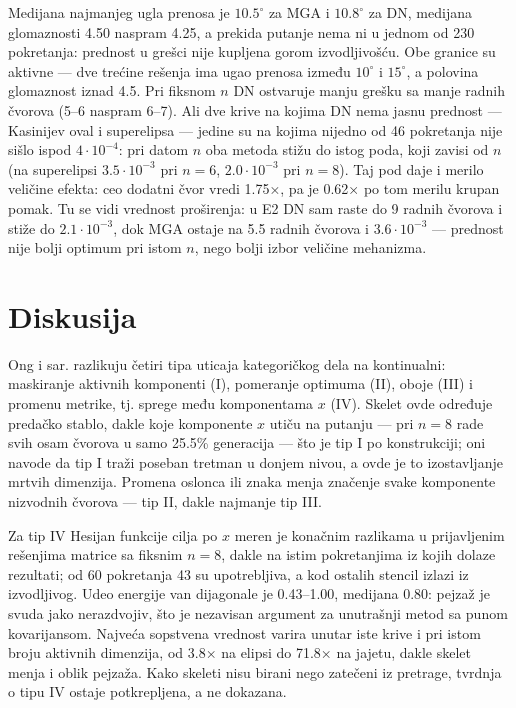 \documentclass[
  conference,
  a4paper,
  10pt]{IEEEtran}
\begin{document}
Medijana najmanjeg ugla prenosa je \(10.5^\circ\) za MGA i
\(10.8^\circ\) za DN, medijana glomaznosti 4.50 naspram 4.25, a prekida
putanje nema ni u jednom od 230 pokretanja: prednost u grešci nije
kupljena gorom izvodljivošću. Obe granice su aktivne --- dve trećine
rešenja ima ugao prenosa između \(10^\circ\) i \(15^\circ\), a polovina
glomaznost iznad 4.5. Pri fiksnom \(n\) DN ostvaruje manju grešku sa
manje radnih čvorova (5--6 naspram 6--7). Ali dve krive na kojima DN
nema jasnu prednost --- Kasinijev oval i superelipsa --- jedine su na
kojima nijedno od 46 pokretanja nije sišlo ispod \(4\cdot10^{-4}\): pri
datom \(n\) oba metoda stižu do istog poda, koji zavisi od \(n\) (na
superelipsi \(3.5\cdot10^{-3}\) pri \(n=6\), \(2.0\cdot10^{-3}\) pri
\(n=8\)). Taj pod daje i merilo veličine efekta: ceo dodatni čvor vredi
1.75×, pa je 0.62× po tom merilu krupan pomak. Tu se vidi vrednost
proširenja: u E2 DN sam raste do 9 radnih čvorova i stiže do
\(2.1\cdot10^{-3}\), dok MGA ostaje na 5.5 radnih čvorova i
\(3.6\cdot10^{-3}\) --- prednost nije bolji optimum pri istom \(n\),
nego bolji izbor veličine mehanizma.

\hypertarget{diskusija}{%
\section{Diskusija}\label{diskusija}}

Ong i sar. \citep{igbd} razlikuju četiri tipa uticaja kategoričkog dela
na kontinualni: maskiranje aktivnih komponenti (I), pomeranje optimuma
(II), oboje (III) i promenu metrike, tj. sprege među komponentama \(x\)
(IV). Skelet ovde određuje predačko stablo, dakle koje komponente \(x\)
utiču na putanju --- pri \(n=8\) rade svih osam čvorova u samo 25.5\%
generacija --- što je tip I po konstrukciji; oni navode da tip I traži
poseban tretman u donjem nivou, a ovde je to izostavljanje mrtvih
dimenzija. Promena oslonca ili znaka menja značenje svake komponente
nizvodnih čvorova --- tip II, dakle najmanje tip III.

Za tip IV Hesijan funkcije cilja po \(x\) meren je konačnim razlikama u
prijavljenim rešenjima matrice sa fiksnim \(n = 8\), dakle na istim
pokretanjima iz kojih dolaze rezultati; od 60 pokretanja 43 su
upotrebljiva, a kod ostalih stencil izlazi iz izvodljivog. Udeo energije
van dijagonale je 0.43--1.00, medijana 0.80: pejzaž je svuda jako
nerazdvojiv, što je nezavisan argument za unutrašnji metod sa punom
kovarijansom. Najveća sopstvena vrednost varira unutar iste krive i pri
istom broju aktivnih dimenzija, od 3.8× na elipsi do 71.8× na jajetu,
dakle skelet menja i oblik pejzaža. Kako skeleti nisu birani nego
zatečeni iz pretrage, tvrdnja o tipu IV ostaje potkrepljena, a ne
dokazana.
\end{document}

